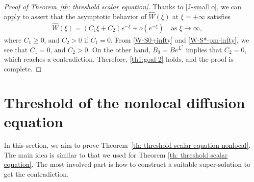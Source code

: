 \documentclass[11pt,a4paper]{article}
\numberwithin{equation}{section}
\numberwithin{figure}{section}
\newcommand\beaa{\begin{eqnarray*}}
\newcommand\eeaa{\end{eqnarray*}}
\begin{document}
\begin{proof}[Proof of Theorem~\ref{th: threshold scalar equation}]
Thanks to \eqref{J-small o}, we can apply
\cite[Chapter 3, Theorem 8.1]{CoddingtonLevison} to assert that
the asymptotic behavior of $\widehat{W}(\xi)$ at $\xi=+\infty$ satisfies
\beaa
\widehat{W}(\xi)=(C_1\xi+C_2)e^{-\xi}+o(e^{-\xi})\quad \mbox{as $\xi\to\infty$},
\eeaa
where  $C_1\geq0$, and $C_2>0$ if $C_1=0$. From \eqref{W-S0+infty} and \eqref{W-S*-pm-infty}, we see that $C_1=0$, and $C_2>0$. On the other hand, $B_0=Be^{ L^*}$ implies that $C_2=0$, which reaches a contradiction.
Therefore, \eqref{th1:goal-2} holds, and the proof is complete.
\end{proof}




\section{Threshold of the nonlocal diffusion equation}\label{sec: threshold scalar nonlocal}


In this section, we aim to prove Theorem~\ref{th: threshold scalar equation nonlocal}. 
The main idea is similar to that we used for Theorem \ref{th: threshold scalar equation}. The most involved part is how to construct a suitable super-solution to get the contradiction.
\end{document}
